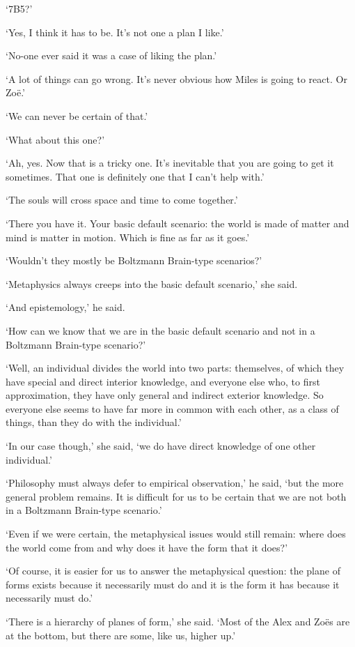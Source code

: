 `7B5?'

`Yes, I think it has to be. It's not one a plan I like.'

`No-one ever said it was a case of liking the plan.'

`A lot of things can go wrong. It's never obvious how Miles is going to react. Or Zoë.'

`We can never be certain of that.'

`What about this one?'

`Ah, yes. Now that is a tricky one. It's inevitable that you are going to get it sometimes. That one is definitely one that I can't help with.'

`The souls will cross space and time to come together.'

`There you have it. Your basic default scenario: the world is made of matter and mind is matter in motion. Which is fine as far as it goes.'

`Wouldn't they mostly be Boltzmann Brain-type scenarios?'

`Metaphysics always creeps into the basic default scenario,' she said.

`And epistemology,' he said.

`How can we know that we are in the basic default scenario and not in a Boltzmann Brain-type scenario?'

`Well, an individual divides the world into two parts: themselves, of which they have special and direct interior knowledge, and everyone else who, to first approximation, they have only general and indirect exterior knowledge. So everyone else seems to have far more in common with each other, as a class of things, than they do with the individual.'

`In our case though,' she said, `we do have direct knowledge of one other individual.'

`Philosophy must always defer to empirical observation,' he said, `but the more general problem remains. It is difficult for us to be certain that we are not both in a Boltzmann Brain-type scenario.'

`Even if we were certain, the metaphysical issues would still remain: where does the world come from and why does it have the form that it does?'

`Of course, it is easier for us to answer the metaphysical question: the plane of forms exists because it necessarily must do and it is the form it has because it necessarily must do.'

`There is a hierarchy of planes of form,' she said. `Most of the Alex and Zoës are at the bottom, but there are some, like us, higher up.'

